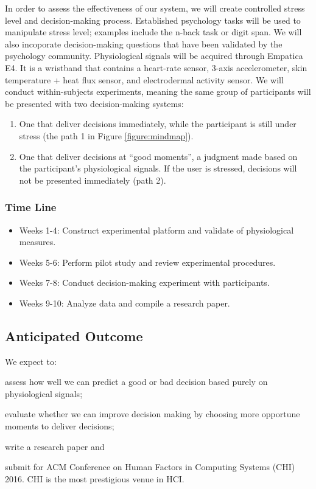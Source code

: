 \documentclass[12pt]{article}
\begin{document}
In order to assess the effectiveness of our system, we will create controlled stress level and decision-making process. Established psychology tasks will be used to manipulate stress level; examples include the n-back task or digit span. We will also incoporate decision-making questions that have been validated by the psychology community. Physiological signals will be acquired through Empatica E4. It is a wristband that contains a heart-rate sensor, 3-axis accelerometer, skin temperature + heat flux sensor, and electrodermal activity sensor. We will conduct within-subjects experiments, meaning the same group of participants will be presented with two decision-making systems:
\begin{enumerate}
\itemsep1pt\parskip0pt
\item One that deliver decisions immediately, while the participant is still under stress (the path 1 in Figure \ref{figure:mindmap}). 
\item One that deliver decisions at ``good moments'', a judgment made based on the participant's physiological signals. If the user is stressed, decisions will not be presented immediately (path 2).
\end{enumerate}



\subsubsection{Time Line}
\begin{itemize} 
\itemsep0pt\parskip0pt
\item Weeks 1-4: Construct experimental platform and validate of physiological measures.
\item Weeks 5-6: Perform pilot study and review experimental procedures.
\item Weeks 7-8: Conduct decision-making experiment with participants.
\item Weeks 9-10: Analyze data and compile a research paper.
\end{itemize}


\subsection{Anticipated Outcome}\label{anticipated-outcome}
We expect to:
\begin{inparaenum}[\itshape 1\upshape)]
\item
  assess how well we can predict a good or bad decision based purely on physiological signals;
\item 
  evaluate whether we can improve decision making by choosing more opportune moments to deliver decisions;
\item
  write a research paper and
\item
  submit for ACM Conference on Human Factors in Computing Systems (CHI) 2016. CHI is the most prestigious venue in HCI.
\end{inparaenum}
\end{document}

